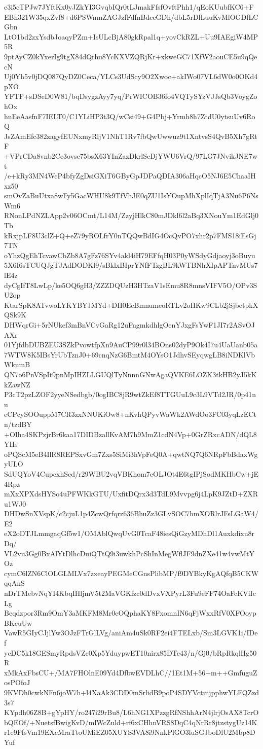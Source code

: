 e3i5cTPJw7JYftKx0yJZkYI3GvqbIQr0tLJmakFfsfOvftPhh1/qEoKUubfKC6+F
EBh321W35qxZvf8+d6PSWnmZAGJzfFdfnBdeeGDh/dbL5rDlLuuKvMlOGDfLCGbn
LtO1bd2zxYsdbJoaqyPZm+IsULcBjA80gkRpal1q+yovCkRZL+Uu9IAEgiW4MP5R
9ptAyCZ0kYxerIg9tgX84dQrhu8YcKXVZQRjKr+xkweGC71XfW2aouCE5u9qQecN
Uj0Yh5v0jDQ087QyDZ0Ceca/YLCs3UdScy9O2Xwoc+akIWo07VL6dW0o0OKd4pXO
YFTF+sDSeD0W81/bqDsygzAyy7yq/PrWICOB36fo4VQTySYzVJJsQb3VoygZohOx
hnEeAasfnF7IELT0/C1YLiHP3t3Q/wCsi49+G4Pbj+Yrmh8h7ZtdU0ytsuUv6RoQ
JsZAmEfc382zagyfEUNxmyRljV1NhT1Rv7fbQwUwwuz9t1XntvsS4QvB5Xh7gRtF
+VPrCDa8vnb2Ce3ovse75bsX63YInZazDkrlScDjYWU6VrQ/97LG7JNvikJNE7wt
/e+kRy3MN4WcP4bfyZgDsiGXiT6GByGpJDPaQDIA306aHqcO5NJ6E5ChaaIHxz50
smOvZaBuUtxa8wFy5GacWHU8k9TfVhJE0qZU1IsYOupMhXplIqTjA3Nu6P6NsWm6
RNonLPdNZLApp2v06OCmt/L14M/ZzyjHlkC80mJDkl6l2aBq3XNouYm1EdGlj0Tb
kRxjpLF8U3clZ+Q+eZ79yROLfrY0nTQQwBdIG4OcQvPO7xhr2p7FMS18iEsGj7TN
oYhzQgEhTcvawCbZb8A7gFz76SYv4akl4iH79EFfqH03P0yWSdyGdjaoyj3oBuyu
5X6I6sTCUQJgTJAdDODKl9/sBklxBIprYNfFTzgBL9kWTBNhXIpAPTnvMUs7lE4z
dyCgIfT8LwLp/ke5OQ6gH3/ZZZDQUzH3HTzaV1sEmu8R8mnsVIFV5O/OPv3SU2op
KtarSpK8ATvwoLYKYBYJMYd+DH0EcBmnumeoRTLv2oHKw9CLb2jSjbetpkXQSk9K
DHWqrGi+5rNUkef3mBnVCvGaRg12uFngmkdhlgOenYJxgFsYwF1JI7r2ASvOJAXr
01YjfdbDUBZEU3SZkPvowtfpXn9AuCP99r0l34BOns02dyP9Ok4I7u4UaUanb05a
7WTW8K5IBsYrUbTznJ0+69cnqNzG6BmtM4OYsO1JdhvSEyqwgLB8iNDKlVbWkumB
QN7o6PnVSpIt9pnMpIHZLLGUQlTyNnnnGNwAgaQVKE6LOZK3tkHB2yJ5kKkZawNZ
P3cT2pzLZOF2yyeNSedbgb/0ogIBC8jR9wtZkEf8TTGUuL9c3L9VTd2JR/0p41nu
eCPcySOOuppM7CR3zxNNUKiOw8+nKvhQPyvWaWk2AWdOo3FC03yqLzECtn/tzdBY
+OIha4SKPzjrBr6kaa17DIDBzallKvAM7h9MmZ1cdN4Vp+0GrZRxcADN/dQL8YHs
oPQScM5eB4IlR8REPSxvGm7Zxs5SiMi3hVpFeQ0A+qwtNQ7Q6NRpFbBdaxWgyULO
SdUQYoV4CupcxhScd/r29WBU2vqVBKhom7eOLJOt4E6tgIPjSodMKHbCw+jE4Rpz
mXxXPXdsHYSo4uPFWKkGTU/UxfitDQrx3d3TdL9Mvvpg6j4LpK9JZtD+ZXRu1WJ0
DHDwSnXVspK/c2cjuL1p4ZcwQrfqrz636BhuZz3GLvSOC7hmXORlrJFsLGaW4/E2
eX2oDTJLmmgaqGf5w1/OMAblQwqUvG0TcaF48iesQiGzyMDhDl1Auxkdixu8rDq/
VL2vu3Gg0BxAlYtDlhcDuiQTtQ9i3uwkhPcShInMegWflJF9dnZXe41w4vwMtYOz
cymC6lZN6ClOLGLMLVx7zxeayPEGMeCGnsPlibMP/f9DYBkyKgAQfqB5CKWqqAnS
nDrTMebvNqYI4KbqIHljmV5t2MaVGKfzc0dDvxVXPyrL3Fu9eFF74OaFcKViIcLg
Beqdzpor3Rm9OmY3aMKFM8Mr0eOQphaKY8FxomnIN6qFjWxxRfV0XFOoypBKcuUw
VawR5GIyCJjlYw3OJzFTrGlLVg/aniAm4uSk0RF2ei4FTELxb/Sm3LGVK1i/IDef
ycDC5k18GESmyRpdsVZc0Xp5YduypwET10nirx85DTe43/n/Gj0/bRpRkqlHg50R
xMkAxFbsCU+/MA7FHOlnE09Yd4DfbwEVDLhC//1Et1M+56+m++GmfuguZosPOfoJ
9KVDh0cwkNFn6joW7h+l4XaAk3CDD0mSrlidB9poP4SDYVctmjpphwYLFQZzd3s7
KYpdh06Z8B+gYpHY/ro247i29rBu8/L6hNG1XPzzgRfNShhArN4jlrjOsAX8TcrO
bQEOf/+NuetsfBwigKvD/mlWcZuld+rf6xCHhnVRS8DqC4qNrRr8jtzstygUz14K
r1e9FfsVm19EXcMraTtoUMiEZ05XUYS3VA8i9NnkPlGO3luSGJboDlU2Mbp8DYuf
